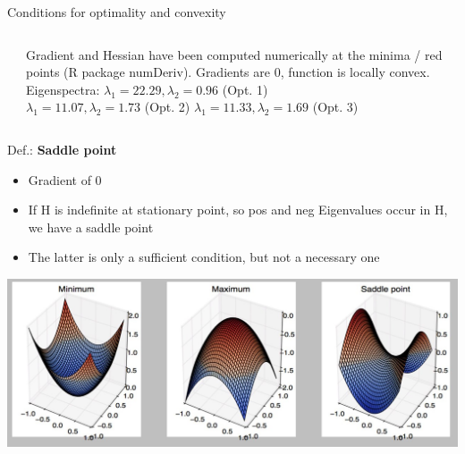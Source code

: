 \documentclass[11pt,compress,t,notes=noshow, xcolor=table]{beamer}
\begin{document}
\begin{vbframe}{Conditions for optimality and convexity}
\begin{columns}
\begin{column}{0.55\textwidth}
\end{column}
\hspace*{-4cm}
\begin{column}{0.3\textwidth}
\begin{tiny}
Gradient and Hessian have been computed numerically at the minima / red points (R package numDeriv). Gradients are 0, function is locally convex. Eigenspectra: 
$\lambda_1 = 22.29, \lambda_2 = 0.96$ (Opt. 1)\\ $\lambda_1 = 11.07, \lambda_2 = 1.73$ (Opt. 2) $\lambda_1 = 11.33, \lambda_2 = 1.69$ (Opt. 3)
\end{tiny}\end{column}
\end{columns}


\framebreak 

Def.: \textbf{Saddle point}
\begin{itemize}
    \item Gradient of 0
    \item If H is indefinite at stationary point, so pos and neg Eigenvalues occur in H, we have a saddle point 
    \item The latter is only a sufficient condition, but not a necessary one
\end{itemize}

\begin{center}
\includegraphics[scale= 0.5]{figure_man/convex.jpg}
\end{center}




\end{vbframe}


  \endlecture
  
\end{document}
